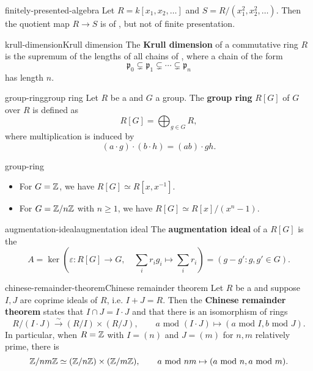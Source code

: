 \begin{example}{finitely-presented-algebra}
    Let $R = k[x_1, x_2, \ldots]$ and $S = R / (x_1^2, x_2^2, \ldots)$. Then the quotient map $R \to S$ is of , but not of finite presentation.
\end{example}

\begin{topic}{krull-dimension}{Krull dimension}
    The \textbf{Krull dimension} of a commutative ring $R$ is the supremum of the lengths of all chains of , where a chain of the form
    \[ \mathfrak{p}_0 \subsetneq \mathfrak{p}_1 \subsetneq \cdots \subsetneq \mathfrak{p}_n \]
    has length $n$.
\end{topic}

\begin{topic}{group-ring}{group ring}
    Let $R$ be a  and $G$ a group. The \textbf{group ring} $R[G]$ of $G$ over $R$ is defined as
    \[ R[G] = \bigoplus_{g \in G} R , \]
    where multiplication is induced by
    \[ (a \cdot g) \cdot (b \cdot h) = (ab) \cdot gh . \]
\end{topic}

\begin{example}{group-ring}
    \begin{itemize}
        \item For $G = \mathbb{Z}$, we have $R[G] \simeq R[x, x^{-1}]$.
        \item For $G = \mathbb{Z}/n\mathbb{Z}$ with $n \ge 1$, we have $R[G] \simeq R[x] / (x^n - 1)$.
    \end{itemize}
\end{example}

\begin{topic}{augmentation-ideal}{augmentation ideal}
    The \textbf{augmentation ideal} of a  $R[G]$ is the 
    \[ A = \ker\left( \varepsilon : R[G] \to G, \quad \sum_i r_i g_i \mapsto \sum_i r_i  \right) = (g - g' : g, g' \in G). \]
\end{topic}

\begin{topic}{chinese-remainder-theorem}{Chinese remainder theorem}
    Let $R$ be a  and suppose $I, J$ are coprime ideals of $R$, i.e. $I + J = R$. Then the \textbf{Chinese remainder theorem} states that $I \cap J = I \cdot J$ and that there is an isomorphism of rings
    \[ R / (I \cdot J) \xrightarrow{\sim} (R / I) \times (R/J), \qquad a \text{ mod } (I \cdot J) \mapsto (a \text{ mod } I, b \text{ mod } J) . \]
    In particular, when $R = \mathbb{Z}$ with $I = (n)$ and $J = (m)$ for $n, m$ relatively prime, there is
    \[ \mathbb{Z} / nm \mathbb{Z} \simeq (\mathbb{Z}/n\mathbb{Z}) \times (\mathbb{Z}/m\mathbb{Z}), \qquad a \text{ mod } nm \mapsto (a \text{ mod } n, a \text{ mod } m) . \]
\end{topic}

